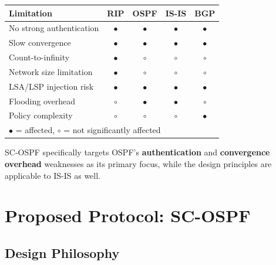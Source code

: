 \documentclass[12pt,a4paper]{article}
\begin{document}
\begin{center}
\begin{tabular}{lcccc}
\toprule
\textbf{Limitation} & \textbf{RIP} & \textbf{OSPF} & \textbf{IS-IS} & \textbf{BGP} \\
\midrule
No strong authentication    & \color{accentred}$\bullet$ & \color{accentred}$\bullet$ & \color{accentred}$\bullet$ & \color{accentred}$\bullet$ \\
Slow convergence            & \color{accentred}$\bullet$ & \color{accentred}$\bullet$ & \color{accentred}$\bullet$ & \color{accentred}$\bullet$ \\
Count-to-infinity           & \color{accentred}$\bullet$ & \color{accentgreen}$\circ$ & \color{accentgreen}$\circ$ & \color{accentgreen}$\circ$ \\
Network size limitation     & \color{accentred}$\bullet$ & \color{accentgreen}$\circ$ & \color{accentgreen}$\circ$ & \color{accentgreen}$\circ$ \\
LSA/LSP injection risk      & \color{accentred}$\bullet$ & \color{accentred}$\bullet$ & \color{accentred}$\bullet$ & \color{accentred}$\bullet$ \\
Flooding overhead           & \color{accentgreen}$\circ$ & \color{accentred}$\bullet$ & \color{accentred}$\bullet$ & \color{accentgreen}$\circ$ \\
Policy complexity           & \color{accentgreen}$\circ$ & \color{accentgreen}$\circ$ & \color{accentgreen}$\circ$ & \color{accentred}$\bullet$ \\
\bottomrule
\multicolumn{5}{l}{\footnotesize $\bullet$ = affected, $\circ$ = not significantly affected}
\end{tabular}
\end{center}

SC-OSPF specifically targets OSPF's \textbf{authentication} and \textbf{convergence
overhead} weaknesses as its primary focus, while the design principles are
applicable to IS-IS as well.

\section{Proposed Protocol: SC-OSPF}

\subsection{Design Philosophy}
\end{document}
